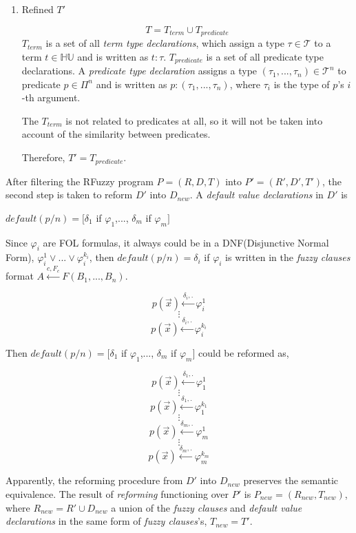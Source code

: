 \begin{enumerate}
 \item Refined $T'$
    
    \[T=T_{term} \cup T_{predicate}\]
    $T_{term}$ is a set of all \textit{term type declarations}, which assign a type $\tau \in \mathcal{T}$ to a term $t \in \mathbb{HU}$ and is written as $t : \tau$. $T_{predicate}$ is a set of all predicate type declarations. A \textit{predicate type declaration} assigns a type $(\tau_1,...,\tau_n) \in \mathcal{T}^n$ to predicate $p\in\Pi^n$ and is written as $p : (\tau_1,...,\tau_n)$, where $\tau_i$ is the type of $p$'s $i$-th argument.

    The $T_{term}$ is not related to predicates at all, so it will not be taken into account of the similarity between predicates.

    Therefore, $T'=T_{predicate}$.
 \end{enumerate}

After filtering the RFuzzy program $P=(R,D,T)$ into $P'=(R',D',T')$, the second step is taken to reform $D'$ into $D_{new}$. A \textit{default value declarations} in $D'$ is
\begin{center}
 $default(p/n)=[\delta_1$ if $\varphi_1$,..., $\delta_m$ if $\varphi_m]$ 
\end{center}

Since $\varphi_i$ are FOL formulas, it always could be in a DNF(Disjunctive Normal Form), $\varphi_i^1 \vee ... \vee \varphi_i^{k_i}$, then $default(p/n) = \delta_i$ if $\varphi_i$ is written in the \textit{fuzzy clauses} format $A \stackrel{c,F_c}{\longleftarrow}F(B_1,...,B_n)$.

\[p(\vec{x}) \stackrel{\delta_i,.}{\longleftarrow} \varphi_i^1\]
\[\vdots\]
\[p(\vec{x}) \stackrel{\delta_i,.}{\longleftarrow} \varphi_i^{k_i}\]

Then $default(p/n)=[\delta_1$ if $\varphi_1$,..., $\delta_m$ if $\varphi_m]$ could be reformed as,

\[p(\vec{x}) \stackrel{\delta_1,.}{\longleftarrow} \varphi_1^1\]
\[\vdots\]
\[p(\vec{x}) \stackrel{\delta_1,.}{\longleftarrow} \varphi_1^{k_1}\]
\[\vdots\]
\[p(\vec{x}) \stackrel{\delta_m,.}{\longleftarrow} \varphi_m^1\]
\[\vdots\]
\[p(\vec{x}) \stackrel{\delta_m,.}{\longleftarrow} \varphi_m^{k_m}\]

Apparently, the reforming procedure from $D'$ into $D_{new}$ preserves the semantic equivalence. The result of \textit{reforming} functioning over $P'$ is $P_{new}=(R_{new},T_{new})$, where $R_{new} = R' \cup D_{new}$ a union of the \textit{fuzzy clauses} and \textit{default value declarations} in the same form of \textit{fuzzy clauses}'s, $T_{new}=T'$. 
